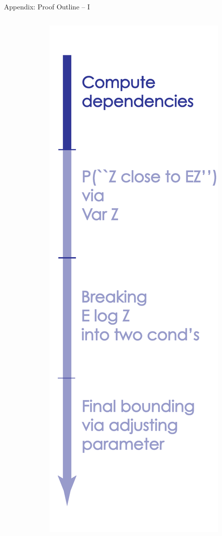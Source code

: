 \documentclass[presentation,12pt]{beamer}
\begin{document}
\begin{frame}{Appendix: Proof Outline -- I}
\begin{columns}
\begin{column}{0.8\textwidth}
  \end{column}
  \begin{column}{0.2\textwidth}
  \hfill \includegraphics[scale=.23]{Proof-1.pdf}

  \end{column}
  \end{columns}

\end{frame}
\end{document}
